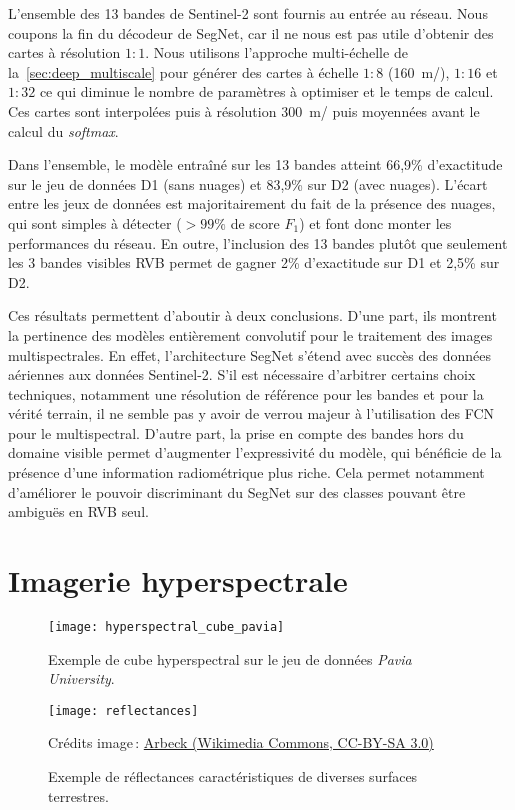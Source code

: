 L'ensemble des 13 bandes de Sentinel-2 sont fournis au entrée au réseau. Nous coupons la fin du décodeur de SegNet, car il ne nous est pas utile d'obtenir des cartes à résolution $1:1$. Nous utilisons l'approche multi-échelle de la~\cref{sec:deep_multiscale} pour générer des cartes à échelle $1:8$ (\SI{160}{\meter/\px}), $1:16$ et $1:32$ ce qui diminue le nombre de paramètres à optimiser et le temps de calcul. Ces cartes sont interpolées puis à résolution \SI{300}{\meter/\px} puis moyennées avant le calcul du \emph{softmax}.

Dans l'ensemble, le modèle entraîné sur les 13 bandes atteint 66,9\% d'exactitude sur le jeu de données D1 (sans nuages) et 83,9\% sur D2 (avec nuages). L'écart entre les jeux de données est majoritairement du fait de la présence des nuages, qui sont simples à détecter ($>99\%$ de score $F_1$) et font donc monter les performances du réseau. En outre, l'inclusion des 13 bandes plutôt que seulement les 3 bandes visibles \gls{RVB} permet de gagner 2\% d'exactitude sur D1 et 2,5\% sur D2.

Ces résultats permettent d'aboutir à deux conclusions. D'une part, ils montrent la pertinence des modèles entièrement convolutif pour le traitement des images multispectrales. En effet, l'architecture SegNet s'étend avec succès des données aériennes aux données Sentinel-2. S'il est nécessaire d'arbitrer certains choix techniques, notamment une résolution de référence pour les bandes et pour la vérité terrain, il ne semble pas y avoir de verrou majeur à l'utilisation des \gls{FCN} pour le multispectral. D'autre part, la prise en compte des bandes hors du domaine visible permet d'augmenter l'expressivité du modèle, qui bénéficie de la présence d'une information radiométrique plus riche. Cela permet notamment d'améliorer le pouvoir discriminant du SegNet sur des classes pouvant être ambiguës en \gls{RVB} seul.


\section{Imagerie hyperspectrale}

\begin{figure}
  \begin{minipage}[t]{0.485\textwidth}
      \texttt{[image: hyperspectral\_cube\_pavia]}
      \caption{Exemple de cube hyperspectral sur le jeu de données \emph{Pavia University}.}
      \label{fig:cube_hyperspectral}
  \end{minipage}
  \hfill
  \begin{minipage}[t]{0.485\textwidth}
      \texttt{[image: reflectances]}
      \caption{Exemple de réflectances caractéristiques de diverses surfaces terrestres.}
      \small{Crédits image\,: \href{https://commons.wikimedia.org/wiki/File:R\%C3\%A9flectance_surfaces_terrestres.png}{Arbeck (Wikimedia Commons, CC-BY-SA 3.0)}}
      \label{fig:reflectances}
  \end{minipage}
\end{figure}


